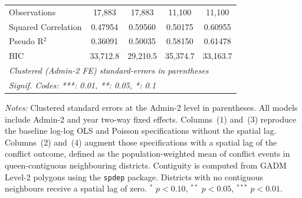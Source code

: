 \begin{tabular}{lcccc}
   Observations            & 17,883                 & 17,883                    & 11,100                     & 11,100\\  
   Squared Correlation     & 0.47954                & 0.59560                   & 0.50175                    & 0.60955\\  
   Pseudo R$^2$            & 0.36091                & 0.50035                   & 0.58150                    & 0.61478\\  
   BIC                     & 33,712.8               & 29,210.5                  & 35,374.7                   & 33,163.7\\  
   \midrule \midrule
   \multicolumn{5}{l}{\emph{Clustered (Admin-2 FE) standard-errors in parentheses}}\\
   \multicolumn{5}{l}{\emph{Signif. Codes: ***: 0.01, **: 0.05, *: 0.1}}\\
\end{tabular}
 
\par \raggedright 
\textit{Notes:} Clustered standard errors at the Admin-2 level in parentheses. All models include Admin-2 and year two-way fixed effects. Columns~(1) and~(3) reproduce the baseline log-log OLS and Poisson specifications without the spatial lag. Columns~(2) and~(4) augment those specifications with a spatial lag of the conflict outcome, defined as the population-weighted mean of conflict events in queen-contiguous neighbouring districts. Contiguity is computed from GADM Level-2 polygons using the \texttt{spdep} package. Districts with no contiguous neighbours receive a spatial lag of zero. $^{*}$ $p<0.10$, $^{**}$ $p<0.05$, $^{***}$ $p<0.01$.
\par\endgroup


